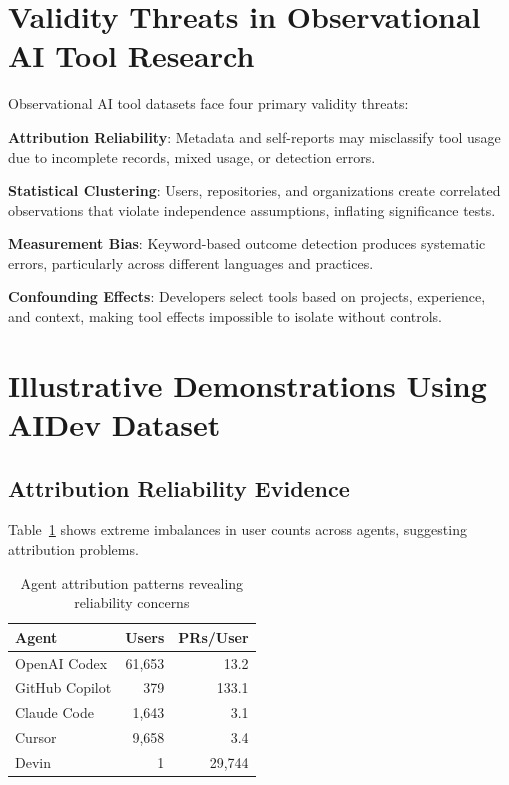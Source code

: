 \documentclass[conference]{IEEEtran}
\begin{document}
\section{Validity Threats in Observational AI Tool Research}

Observational AI tool datasets face four primary validity threats:

\textbf{Attribution Reliability}: Metadata and self-reports may misclassify tool usage due to incomplete records, mixed usage, or detection errors.

\textbf{Statistical Clustering}: Users, repositories, and organizations create correlated observations that violate independence assumptions, inflating significance tests.

\textbf{Measurement Bias}: Keyword-based outcome detection produces systematic errors, particularly across different languages and practices.

\textbf{Confounding Effects}: Developers select tools based on projects, experience, and context, making tool effects impossible to isolate without controls.

\section{Illustrative Demonstrations Using AIDev Dataset}

\subsection{Attribution Reliability Evidence}

Table~\ref{tab:attribution} shows extreme imbalances in user counts across agents, suggesting attribution problems.

\begin{table}[h]
\centering
\caption{Agent attribution patterns revealing reliability concerns}
\label{tab:attribution}
\begin{tabular}{@{}lrr@{}}
\toprule
\textbf{Agent} & \textbf{Users} & \textbf{PRs/User} \\
\midrule
OpenAI Codex & 61,653 & 13.2 \\
GitHub Copilot & 379 & 133.1 \\
Claude Code & 1,643 & 3.1 \\
Cursor & 9,658 & 3.4 \\
Devin & 1 & 29,744 \\
\bottomrule
\end{tabular}
\end{table}
\end{document}
